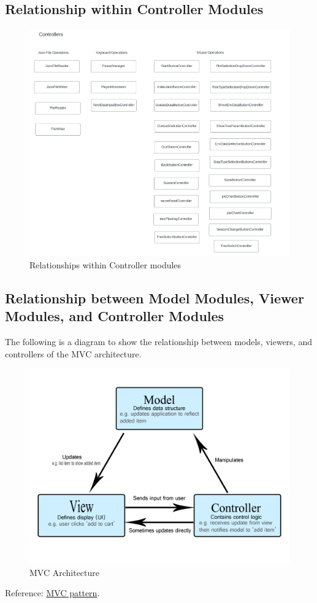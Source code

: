 \documentclass[12pt, titlepage]{article}
\begin{document}
\newpage

\subsection{Relationship within Controller Modules} \label{SecRBCM}
\begin{figure}[H]
\centering
\caption{Relationships within Controller modules}
\label{FigRelaControllers}
\includegraphics[scale=0.65]{MG_Pictures/Controller-Modules.png}
\end{figure}

\newpage

\subsection{Relationship between Model Modules, Viewer Modules, and Controller Modules} \label{SecRBMVC}
The following is a diagram to show the relationship between models, viewers, and controllers
of the MVC architecture.
\begin{figure}[H]
\centering
\caption{MVC Architecture}
\label{MVCArchitecture}
\includegraphics[scale=0.8]{MG_Pictures/MVC.png}
\end{figure}
\noindent Reference: \href{https://developer.mozilla.org/en-US/docs/Glossary/MVC}{MVC pattern}.
\end{document}
